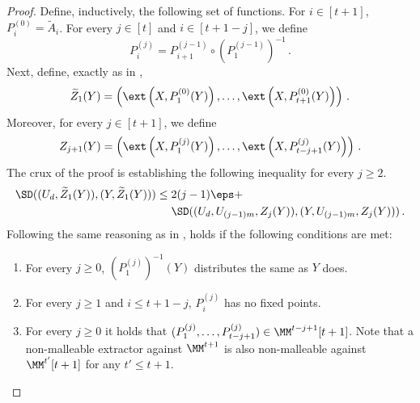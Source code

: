 \documentclass{toc}
\begin{document}
\begin{proof}
Define, inductively, the following set of functions. 
For $i \in [t+1]$, $P_i^{(0)} = \widetilde{A}_i$. For every
$j \in [t]$ and $i \in [t+1-j]$, we define
\begin{equation}\label{eq:composing perm}
P_i^{(j)} = P_{i+1}^{(j-1)} \circ \left( P_{1}^{(j-1)} \right)^{-1}\,.
\end{equation}
Next, define, exactly as in ,
\[
\widetilde{Z}_1(Y) = \left( \ext\left(X,P_{1}^{(0)}(Y)\right),\ldots, \ext\left(X,P_{t+1}^{(0)}(Y)\right) \right)\,.
\]
Moreover, for every $j \in [t+1]$, we define
\[
Z_{j+1}(Y) = \left( \ext\left(X,P_{1}^{(j)}(Y)\right),\ldots, \ext\left(X,P_{t-j+1}^{(j)}(Y)\right)\right)\,.
\]
The crux of the proof is establishing the following inequality for every $j \ge 2$.
\begin{align}\label{eq:pm}
\SD((U_d,\widetilde{Z}_1(Y)),(Y,\widetilde{Z}_1(Y))) &\le 2(j-1)\eps + \nonumber \\
& ~~~~\SD((U_{d},U_{(j-1)m},Z_j(Y)),(Y,U_{(j-1)m},Z_{j}(Y)))\,.
\end{align}
Following the same reasoning as in ,  holds if the 
following conditions are met:
\begin{enumerate}
\item\label{it:pm1}	For every $j \ge 0$, $\left(P_{1}^{(j)}\right)^{-1}(Y)$ distributes the same as $Y$ does.
\item\label{it:pm2}	For every $j \ge 1$ and $i \le t+1-j$, $P_{i}^{(j)}$ has no fixed points.
\item\label{it:pm3}	For every $j \ge 0$ it holds that $( P_{1}^{(j)},\ldots,P_{t-j+1}^{(j)} ) \in \MM^{t-j+1}[t+1]$.
Note that a non-malleable extractor against $\MM^{t+1}$
is also non-malleable against $\MM^{t'}[t+1]$ for any $t' \le t+1$. 
\end{enumerate}


\end{proof}
\end{document}
